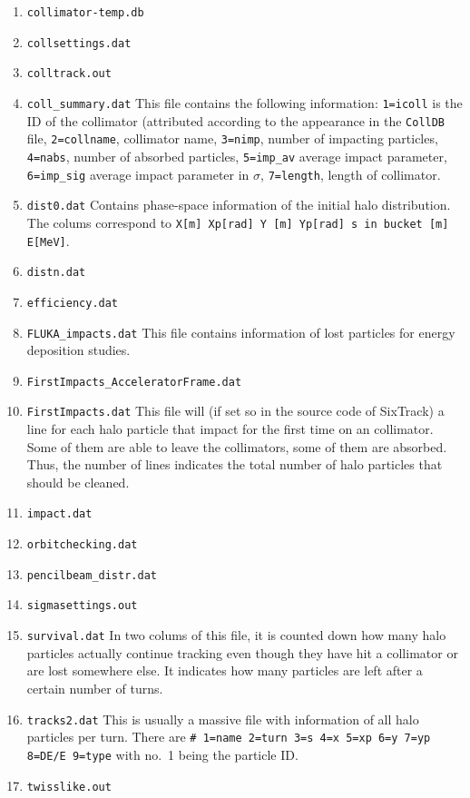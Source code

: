 \documentclass[a4paper, oneside, final]{scrartcl}
\begin{document}
{{\begin{enumerate}
\item \texttt{collimator-temp.db}
\item \texttt{collsettings.dat}
\item \texttt{colltrack.out}

\item \texttt{coll\_summary.dat} This file contains the following information: \texttt{1=icoll} is the ID of the collimator (attributed according to the appearance in the \texttt{CollDB} file, \texttt{2=collname}, collimator name, \texttt{3=nimp}, number of impacting particles, \texttt{4=nabs}, number of absorbed particles, \texttt{5=imp\_av} average impact parameter, \texttt{6=imp\_sig} average impact parameter in $\sigma$, \texttt{7=length}, length of collimator.

\item \texttt{dist0.dat} Contains phase-space information of the initial halo distribution. The colums correspond to \texttt{X[m]   Xp[rad]   Y [m]   Yp[rad]   s in bucket [m]  E[MeV]}.

\item \texttt{distn.dat}
\item \texttt{efficiency.dat} 

\item \texttt{FLUKA\_impacts.dat} This file contains information of lost particles for energy deposition studies. 

\item \texttt{FirstImpacts\_AcceleratorFrame.dat}
\item \texttt{FirstImpacts.dat} This file will (if set so in the source code of SixTrack) a line for each halo particle that impact for the first time on an collimator. Some of them are able to leave the collimators, some of them are absorbed. Thus, the number of lines indicates the total number of halo particles that should be cleaned.

\item \texttt{impact.dat}
\item \texttt{orbitchecking.dat}
\item \texttt{pencilbeam\_distr.dat}
\item \texttt{sigmasettings.out}
\item \texttt{survival.dat} In two colums of this file, it is counted down how many halo particles actually continue tracking even though they have hit a collimator or are lost somewhere else. It indicates how many particles are left after a certain number of turns.

\item \texttt{tracks2.dat} This is usually a massive file with information of all halo particles per turn. There are \texttt{\# 1=name 2=turn 3=s 4=x 5=xp 6=y 7=yp 8=DE/E 9=type} with no.~1 being the particle ID.
\item \texttt{twisslike.out}
\end{enumerate}


}}
\end{document}
